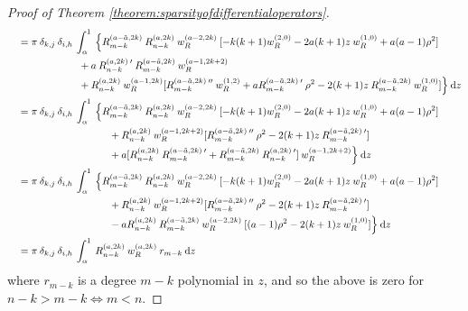 \documentclass[11pt, oneside]{article}   	%
\begin{document}
\begin{proof}[Proof of Theorem \ref{theorem:sparsityofdifferentialoperators}]
\begin{align*}
	&\quad = \pi \: \delta_{k,j} \: \delta_{i,h} \: \int_\alpha^1 \: \Big\{ R_{m-k}^{(a - \tilde a, 2k)} \: R_{n-k}^{(a,2k)} \: w_R^{(a - 2, 2k)} \: [-k(k+1) w_R^{(2,0)} - 2a(k+1)z \: w_R^{(1,0)} + a (a-1) \rho^2] \\
	&\quad \quad \quad \quad \quad \quad \quad + a \: R_{n-k}^{(a,2k) \: \prime} \: R_{m-k}^{(a - \tilde a, 2k)} \: w_R^{(a - 1, 2k+2)} \\
	&\quad \quad \quad \quad \quad \quad \quad + R_{n-k}^{(a,2k)} \: w_R^{(a-1, 2k)} [R_{m-k}^{(a - \tilde a, 2k) \: \prime \prime} \: w_R^{(1, 2)} + a R_{m-k}^{(a - \tilde a, 2k) \: \prime} \: \rho^2 - 2(k+1) z \: R_{m-k}^{(a - \tilde a, 2k)} \: w_R^{(1, 0)}] \Big\} \: {\rm d} z \\
	&\quad = \pi \: \delta_{k,j} \: \delta_{i,h} \: \int_\alpha^1 \: \Big\{ R_{m-k}^{(a - \tilde a, 2k)} \: R_{n-k}^{(a,2k)} \: w_R^{(a - 2, 2k)} \: [-k(k+1) w_R^{(2,0)} - 2a(k+1)z \: w_R^{(1,0)} + a (a-1) \rho^2] \\
	&\quad \quad \quad \quad \quad \quad \quad \quad \quad \quad + R_{n-k}^{(a,2k)} \: w_R^{(a - 1, 2k+2)} [R_{m-k}^{(a - \tilde a, 2k) \: \prime \prime} \: \rho^2 - 2(k+1) z \: R_{m-k}^{(a - \tilde a, 2k) \: \prime} ] \\
	&\quad \quad \quad \quad \quad \quad \quad \quad \quad \quad + a [R_{n-k}^{(a,2k)} \: R_{m-k}^{(a - \tilde a, 2k) \: \prime} + R_{m-k}^{(a - \tilde a, 2k)} \: R_{n-k}^{(a, 2k) \: \prime}] \: w_R^{(a-1, 2k+2)} \Big\} \: {\rm d} z \\
	&\quad = \pi \: \delta_{k,j} \: \delta_{i,h} \: \int_\alpha^1 \: \Big\{ R_{m-k}^{(a - \tilde a, 2k)} \: R_{n-k}^{(a,2k)} \: w_R^{(a - 2, 2k)} \: [-k(k+1) w_R^{(2,0)} - 2a(k+1)z \: w_R^{(1,0)} + a (a-1) \rho^2] \\
	&\quad \quad \quad \quad \quad \quad \quad \quad \quad \quad + R_{n-k}^{(a,2k)} \: w_R^{(a - 1, 2k+2)} [R_{m-k}^{(a - \tilde a, 2k) \: \prime \prime} \: \rho^2 - 2(k+1) z \: R_{m-k}^{(a - \tilde a, 2k) \: \prime} ] \\
	&\quad \quad \quad \quad \quad \quad \quad \quad \quad \quad - a R_{n-k}^{(a,2k)} \: R_{m-k}^{(a - \tilde a, 2k)} \: w_R^{(a-2, 2k)} \: [(a-1) \rho^2 - 2(k+1) z \: w_R^{(1, 0)}] \Big\} \: {\rm d} z \\
	&\quad = \pi \: \delta_{k,j} \: \delta_{i,h} \: \int_\alpha^1 \: R_{n-k}^{(a,2k)} \: w_R^{(a, 2k)} \: r_{m-k} \: {\rm d} z
\end{align*}
where $r_{m-k}$ is a degree $m - k$ polynomial in $z$, and so the above is zero for $n - k > m - k \iff m < n$.


\end{proof}
\end{document}
